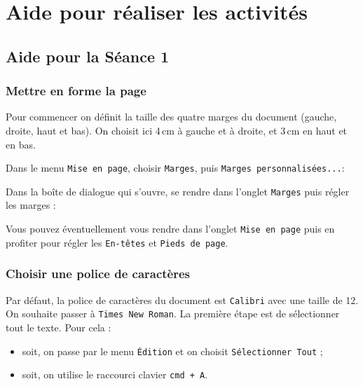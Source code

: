 



\section{Aide pour réaliser les activités}
\subsection{\label{correction_texte01}Aide pour la Séance 1}

\subsubsection{Mettre en forme la page}

Pour commencer on définit la taille des quatre marges du document (gauche, droite, haut et bas). On choisit ici 4\,cm à gauche et à droite, et 3\,cm en haut et en bas.

Dans le menu \texttt{Mise en page}, choisir \texttt{Marges}, puis \texttt{Marges personnalisées...}:    


Dans la boîte de dialogue qui s'ouvre, se rendre dans l'onglet \texttt{Marges} puis régler les marges :  


Vous pouvez éventuellement vous rendre dans l'onglet \texttt{Mise en page} puis en profiter pour régler les \texttt{En-têtes} et \texttt{Pieds de page}.











\subsubsection{Choisir une police de caractères}

Par défaut, la police de caractères du document est \texttt{Calibri} avec une taille de 12. On souhaite passer à \texttt{Times New Roman}. La première étape est de sélectionner tout le texte. Pour cela :

\begin{itemize}
\item soit, on passe par le menu \texttt{Édition} et on choisit \texttt{Sélectionner Tout} ;
\item soit, on utilise le raccourci clavier \texttt{cmd + A}.    
\end{itemize}

